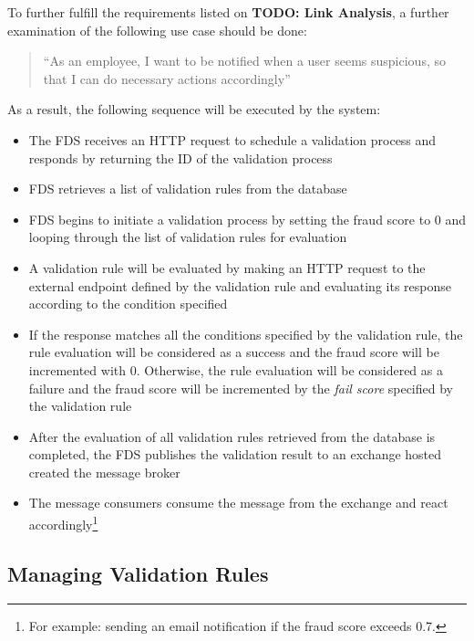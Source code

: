 To further fulfill the requirements listed on \textbf{TODO: Link Analysis}, a further examination of the following use case should be done:

\begin{quotation}
 \enquote{As an employee, I want to be notified when a user seems suspicious, so that I can do necessary actions accordingly} 
\end{quotation}

As a result, the following sequence will be executed by the system:

\begin{itemize}
 \item The FDS receives an HTTP request to schedule a validation process and responds by returning the ID of the validation process
 \item FDS retrieves a list of validation rules from the database
 \item FDS begins to initiate a validation process by setting the fraud score to 0 and looping through the list of validation rules for evaluation
 \item A validation rule will be evaluated by making an HTTP request to the external endpoint defined by the validation rule and evaluating its response according to the condition specified
 \item If the response matches all the conditions specified by the validation rule, the rule evaluation will be considered as a success and the fraud score will be incremented with 0. Otherwise, the rule evaluation will be considered as a failure and the fraud score will be incremented by the \emph{fail score} specified by the validation rule
 \item After the evaluation of all validation rules retrieved from the database is completed, the FDS publishes the validation result to an exchange hosted created the message broker
 \item The message consumers consume the message from the exchange and react accordingly\footnote{For example: sending an email notification if the fraud score exceeds 0.7.}
\end{itemize}

\subsection{Managing Validation Rules}

